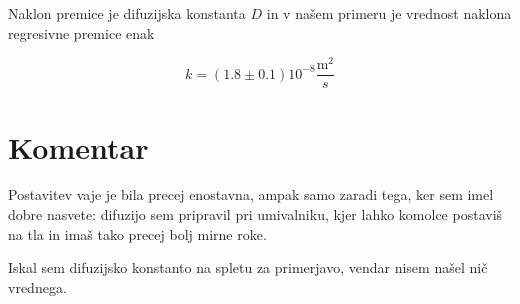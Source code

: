 \documentclass[11pt]{article}
\begin{document}
Naklon premice je difuzijska konstanta \(D\) in v našem primeru je vrednost naklona regresivne premice enak

\[ k = (1.8 \pm 0.1) 10^{-8} \frac{\mathrm{m} ^2}{s}
\]
\section{Komentar}\label{sec:org58c18e0}

Postavitev vaje je bila precej enostavna, ampak samo zaradi tega, ker sem imel dobre nasvete: difuzijo sem pripravil pri umivalniku, kjer lahko komolce postaviš na tla in imaš tako precej bolj mirne roke.

Iskal sem difuzijsko konstanto na spletu za primerjavo, vendar nisem našel nič vrednega.

\printbibliography[heading=bibintoc]
\end{document}
